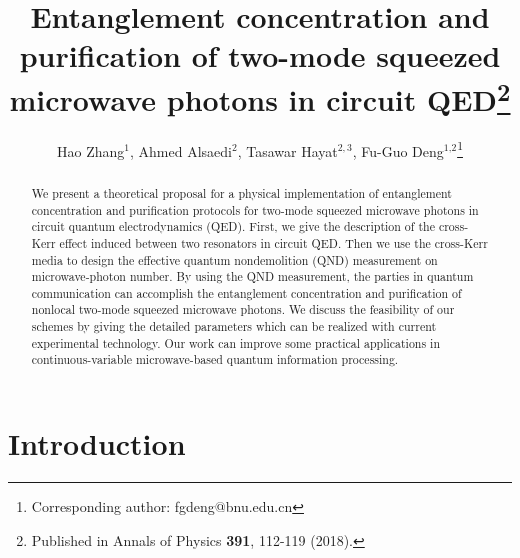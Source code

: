\documentclass[preprintnumbers,showkeys,amsmath,amssymb]{revtex4}%
\begin{document}
\preprint{}



\title{Entanglement concentration and purification of two-mode squeezed microwave photons in circuit QED\footnote{Published in Annals of Physics \textbf{391}, 112-119 (2018).}}

\author{Hao Zhang$^{1}$, Ahmed Alsaedi$^{2}$, Tasawar  Hayat$^{2,3}$, Fu-Guo
Deng$^{\text{1,2}}$\footnote{Corresponding author:
fgdeng@bnu.edu.cn}}

\address{$^{1}$Department of Physics, Applied Optics Beijing Area Major Laboratory,
Beijing Normal University, Beijing 100875, China\\
$^{2}$NAAM Research Group, Department of Mathematics, King Abdulaziz
University, Jeddah 21589, Saudi Arabia\\
$^{3}$Department of Mathematics, Quaid-I-Azam University, Islamabad
44000, Pakistan }




\begin{abstract}
We present a theoretical proposal for a physical implementation of
entanglement concentration and purification protocols for two-mode
squeezed microwave photons in circuit quantum electrodynamics (QED).
First, we give the description of the cross-Kerr effect induced
between two resonators in circuit QED. Then we use the cross-Kerr
media to design the effective quantum nondemolition (QND)
measurement on microwave-photon number. By using the QND
measurement, the parties in quantum communication can accomplish the
entanglement concentration and purification of nonlocal two-mode
squeezed microwave photons. We discuss the feasibility of our
schemes by giving the detailed parameters which can be realized with
current experimental technology. Our work can improve some practical
applications in continuous-variable microwave-based quantum
information processing.
\end{abstract}






\maketitle

\section{Introduction}
\end{document}
